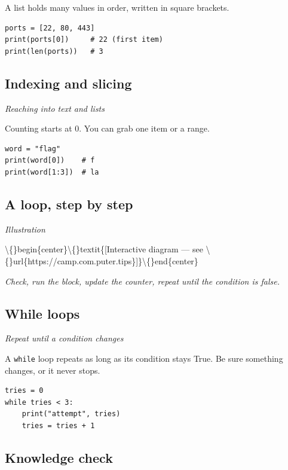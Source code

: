\documentclass[12pt,openany]{book}
\begin{document}
A list holds many values in order, written in square brackets.

\begin{lstlisting}
ports = [22, 80, 443]
print(ports[0])     # 22 (first item)
print(len(ports))   # 3\end{lstlisting}

\medskip

\subsection*{Indexing and slicing}
{\small\itshape\color{gray}Reaching into text and lists}


Counting starts at 0. You can grab one item or a range.

\begin{lstlisting}
word = "flag"
print(word[0])    # f
print(word[1:3])  # la\end{lstlisting}

\medskip

\subsection*{A loop, step by step}
{\small\itshape\color{gray}Illustration}

\textbackslash\{\}begin\{center\}\textbackslash\{\}textit\{[Interactive diagram --- see \textbackslash\{\}url\{https://camp.com.puter.tips\}]\}\textbackslash\{\}end\{center\}

{\small\itshape\color{gray}Check, run the block, update the counter, repeat until the condition is false.}

\medskip

\subsection*{While loops}
{\small\itshape\color{gray}Repeat until a condition changes}


A \texttt{while} loop repeats as long as its condition stays True. Be sure something changes, or it never stops.

\begin{lstlisting}
tries = 0
while tries < 3:
    print("attempt", tries)
    tries = tries + 1\end{lstlisting}

\medskip

\subsection*{Knowledge check}
\end{document}
